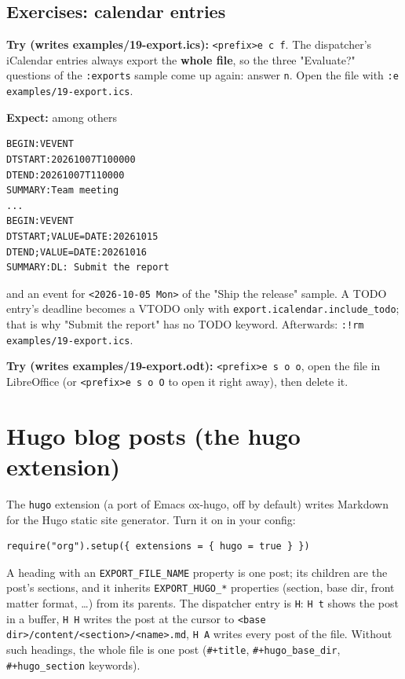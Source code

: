 \subsection{Exercises: calendar entries}
\label{sec:org3682312}
\textbf{Try (writes examples/19-export.ics):} \texttt{<prefix>e c f}. The dispatcher's
iCalendar entries always export the \textbf{whole file}, so the three
"Evaluate?" questions of the \texttt{:exports} sample come up again: answer \texttt{n}.
Open the file with \texttt{:e examples/19-export.ics}.

\textbf{Expect:} among others

\begin{verbatim}
BEGIN:VEVENT
DTSTART:20261007T100000
DTEND:20261007T110000
SUMMARY:Team meeting
...
BEGIN:VEVENT
DTSTART;VALUE=DATE:20261015
DTEND;VALUE=DATE:20261016
SUMMARY:DL: Submit the report
\end{verbatim}

and an event for \texttt{<2026-10-05 Mon>} of the "Ship the release" sample. A
TODO entry's deadline becomes a VTODO only with
\texttt{export.icalendar.include\_todo}; that is why "Submit the report" has no
TODO keyword. Afterwards: \texttt{:!rm examples/19-export.ics}.

\textbf{Try (writes examples/19-export.odt):} \texttt{<prefix>e s o o}, open the file in
LibreOffice (or \texttt{<prefix>e s o O} to open it right away), then delete it.
\section{Hugo blog posts (the hugo extension)}
\label{sec:org2d522f4}
The \texttt{hugo} extension (a port of Emacs ox-hugo, off by default) writes
Markdown for the Hugo static site generator. Turn it on in your config:

\begin{verbatim}
require("org").setup({ extensions = { hugo = true } })
\end{verbatim}

A heading with an \texttt{EXPORT\_FILE\_NAME} property is one post; its children are
the post's sections, and it inherits \texttt{EXPORT\_HUGO\_*} properties (section,
base dir, front matter format, \ldots{}) from its parents. The dispatcher entry
is \texttt{H}: \texttt{H t} shows the post in a buffer, \texttt{H H} writes the post at the
cursor to \texttt{<base dir>/content/<section>/<name>.md}, \texttt{H A} writes every
post of the file. Without such headings, the whole file is one post
(\texttt{\#+title}, \texttt{\#+hugo\_base\_dir}, \texttt{\#+hugo\_section} keywords).
